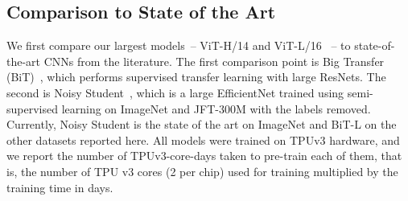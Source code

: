 \documentclass{article} \usepackage{iclr2021_conference,times}
\newcommand{\oursabbrv}{ViT\xspace}
\newcommand{\imagenet}{ImageNet\xspace}
\begin{document}
\subsection{Comparison to State of the Art}

We first compare our largest models~-- \oursabbrv-H/14 and \oursabbrv-L/16 ~-- to state-of-the-art CNNs from the literature.
The first comparison point is Big Transfer (BiT)~\citep{kolesnikov2020-bit}, which performs supervised transfer learning with large ResNets.
The second is Noisy Student~\citep{xie2020-noisystudent},
which is a large EfficientNet trained using semi-supervised learning on \imagenet and JFT-300M with the labels removed.
Currently, Noisy Student is the state of the art on \imagenet and BiT-L on the other datasets reported here.
All models were trained on TPUv3 hardware, and we report the number of TPUv3-core-days taken to pre-train each of them, that is, the number of TPU v3 cores (2 per chip) used for training multiplied by the training time in days.
\end{document}
